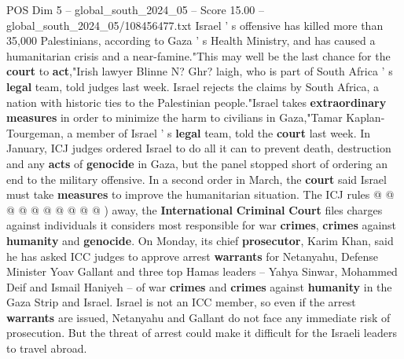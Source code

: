 \begin{textsample}{POS Dim 5 – global\_south\_2024\_05 – Score 15.00 – global\_south\_2024\_05/108456477.txt}
Israel ' s offensive has killed more than 35,000 Palestinians, according to Gaza ' s Health Ministry, and has caused a humanitarian crisis and a near-famine."This may well be the last chance for the \textbf{court} to \textbf{act},"Irish lawyer Blinne N?
Ghr? laigh, who is part of South Africa ' s \textbf{legal} team, told judges last week.
Israel rejects the claims by South Africa, a nation with historic ties to the Palestinian people."Israel takes \textbf{extraordinary} \textbf{measures} in order to minimize the harm to civilians in Gaza,"Tamar Kaplan-Tourgeman, a member of Israel ' s \textbf{legal} team, told the \textbf{court} last week.
In January, ICJ judges ordered Israel to do all it can to prevent death, destruction and any \textbf{acts} of \textbf{genocide} in Gaza, but the panel stopped short of ordering an end to the military offensive.
In a second order in March, the \textbf{court} said Israel must take \textbf{measures} to improve the humanitarian situation.
The ICJ rules @ @ @ @ @ @ @ @ @ @ ) away, the \textbf{International} \textbf{Criminal} \textbf{Court} files charges against individuals it considers most responsible for war \textbf{crimes}, \textbf{crimes} against \textbf{humanity} and \textbf{genocide}.
On Monday, its chief \textbf{prosecutor}, Karim Khan, said he has asked ICC judges to approve arrest \textbf{warrants} for Netanyahu, Defense Minister Yoav Gallant and three top Hamas leaders -- Yahya Sinwar, Mohammed Deif and Ismail Haniyeh -- of war \textbf{crimes} and \textbf{crimes} against \textbf{humanity} in the Gaza Strip and Israel.
Israel is not an ICC member, so even if the arrest \textbf{warrants} are issued, Netanyahu and Gallant do not face any immediate risk of prosecution.
But the threat of arrest could make it difficult for the Israeli leaders to travel abroad.

\end{textsample}
